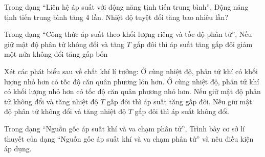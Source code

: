 \begin{ex}
Trong dạng “Liên hệ áp suất với động năng tịnh tiến trung bình”, Động năng tịnh tiến trung bình tăng 4 lần. Nhiệt độ tuyệt đối tăng bao nhiêu lần?
\end{ex}

\begin{ex}
Trong dạng “Công thức áp suất theo khối lượng riêng và tốc độ phân tử”, Nếu giữ mật độ phân tử không đổi và tăng $T$ gấp đôi thì áp suất
\choice
{\True tăng gấp đôi}
{giảm một nửa}
{không đổi}
{tăng gấp bốn}
\end{ex}

\begin{ex}Xét các phát biểu sau về chất khí lí tưởng:
\choiceTF
{\True Ở cùng nhiệt độ, phân tử khí có khối lượng nhỏ hơn có tốc độ căn quân phương lớn hơn.}
{Ở cùng nhiệt độ, phân tử khí có khối lượng nhỏ hơn có tốc độ căn quân phương nhỏ hơn.}
{\True Nếu giữ mật độ phân tử không đổi và tăng nhiệt độ $T$ gấp đôi thì áp suất tăng gấp đôi.}
{Nếu giữ mật độ phân tử không đổi và tăng nhiệt độ $T$ gấp đôi thì áp suất không đổi.}
\end{ex}

\begin{ex}
Trong dạng “Nguồn gốc áp suất khí và va chạm phân tử”, Trình bày cơ sở lí thuyết của dạng “Nguồn gốc áp suất khí và va chạm phân tử” và nêu điều kiện áp dụng.
\choiceTF

\end{ex}

